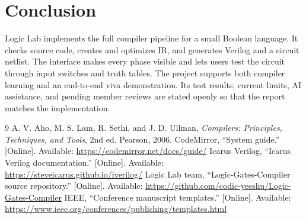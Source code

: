 \documentclass[conference]{IEEEtran}
\begin{document}
\section{Conclusion}
Logic Lab implements the full compiler pipeline for a small Boolean language. It checks source code, creates and optimizes IR, and generates Verilog and a circuit netlist. The interface makes every phase visible and lets users test the circuit through input switches and truth tables. The project supports both compiler learning and an end-to-end viva demonstration. Its test results, current limits, AI assistance, and pending member reviews are stated openly so that the report matches the implementation.

\begin{thebibliography}{9}
 A. V. Aho, M. S. Lam, R. Sethi, and J. D. Ullman, \emph{Compilers: Principles, Techniques, and Tools}, 2nd ed. Pearson, 2006.
 CodeMirror, ``System guide.'' [Online]. Available: \url{https://codemirror.net/docs/guide/}
 Icarus Verilog, ``Icarus Verilog documentation.'' [Online]. Available: \url{https://steveicarus.github.io/iverilog/}
 Logic Lab team, ``Logic-Gates-Compiler source repository.'' [Online]. Available: \url{https://github.com/codic-yeeshu/Logic-Gates-Compiler}
 IEEE, ``Conference manuscript templates.'' [Online]. Available: \url{https://www.ieee.org/conferences/publishing/templates.html}
\end{thebibliography}
\end{document}
